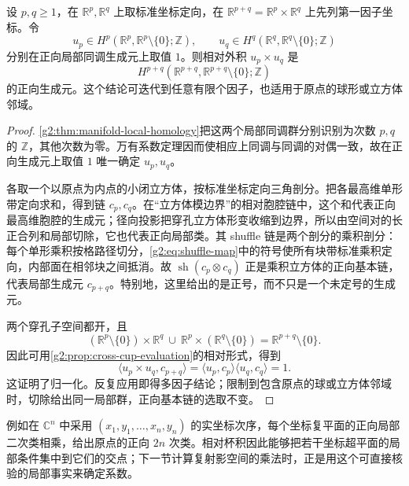 \begin{proposition}\label{g2:prop:local-cross-normalization}
	设 \(p,q\ge1\)，在 \(\mathbb R^p,\mathbb R^q\) 上取标准坐标定向，在 \(\mathbb R^{p+q}=\mathbb R^p\times\mathbb R^q\) 上先列第一因子坐标。令
	\[
		u_p\in H^p(\mathbb R^p,\mathbb R^p\setminus\{0\};\mathbb Z),
		\qquad
		u_q\in H^q(\mathbb R^q,\mathbb R^q\setminus\{0\};\mathbb Z)
	\]
	分别在正向局部同调生成元上取值 \(1\)。则相对外积 \(u_p\times u_q\) 是
	\[
		H^{p+q}(\mathbb R^{p+q},\mathbb R^{p+q}\setminus\{0\};\mathbb Z)
	\]
	的正向生成元。这个结论可迭代到任意有限个因子，也适用于原点的球形或立方体邻域。
\end{proposition}
\begin{proof}
	\cref{g2:thm:manifold-local-homology}把这两个局部同调群分别识别为次数 \(p,q\) 的 \(\mathbb Z\)，其他次数为零。万有系数定理因而使相应上同调与同调的对偶一致，故在正向生成元上取值 \(1\) 唯一确定 \(u_p,u_q\)。

	各取一个以原点为内点的小闭立方体，按标准坐标定向三角剖分。把各最高维单形带定向求和，得到链 \(c_p,c_q\)。在“立方体模边界”的相对胞腔链中，这个和代表正向最高维胞腔的生成元；径向投影把穿孔立方体形变收缩到边界，所以由空间对的长正合列和局部切除，它也代表正向局部类。其 shuffle 链是两个剖分的乘积剖分：每个单形乘积按格路径切分，\eqref{g2:eq:shuffle-map}中的符号使所有块带标准乘积定向，内部面在相邻块之间抵消。故 \(\operatorname{sh}(c_p\otimes c_q)\) 正是乘积立方体的正向基本链，代表局部生成元 \(c_{p+q}\)。特别地，这里给出的是正号，而不只是一个未定号的生成元。

	两个穿孔子空间都开，且
	\[
		(\mathbb R^p\setminus\{0\})\times\mathbb R^q
		\ \cup\ \mathbb R^p\times(\mathbb R^q\setminus\{0\})
		=\mathbb R^{p+q}\setminus\{0\}.
	\]
	因此可用\cref{g2:prop:cross-cup-evaluation}的相对形式，得到
	\[
		\langle u_p\times u_q,c_{p+q}\rangle
		=\langle u_p,c_p\rangle\langle u_q,c_q\rangle=1.
	\]
	这证明了归一化。反复应用即得多因子结论；限制到包含原点的球或立方体邻域时，切除给出同一局部群，正向基本链的选取不变。
\end{proof}

例如在 \(\mathbb C^n\) 中采用 \((x_1,y_1,\ldots,x_n,y_n)\) 的实坐标次序，每个坐标复平面的正向局部二次类相乘，给出原点的正向 \(2n\) 次类。相对杯积因此能够把若干坐标超平面的局部条件集中到它们的交点；下一节计算复射影空间的乘法时，正是用这个可直接核验的局部事实来确定系数。
